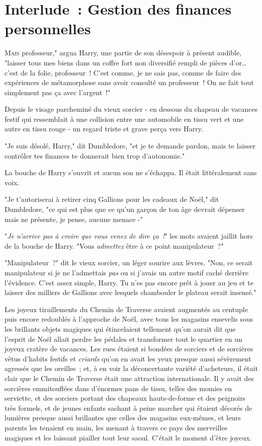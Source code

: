 \chapter{Interlude~: Gestion des finances personnelles}

\lettrine[ante=<<~]{M}{ais} professeur," argua Harry, une partie de son désespoir à présent audible, "laisser tous mes biens dans un coffre fort non diversifié rempli de pièces d'or… c'est de la folie, professeur~! C'est comme, je ne sais pas, comme de faire des expériences de métamorphose sans avoir consulté un professeur~! On ne fait tout simplement pas ça avec l'argent~!"

Depuis le visage parcheminé du vieux sorcier - en dessous du chapeau de vacances festif qui ressemblait à une collision entre une automobile en tissu vert et une autre en tissu rouge - un regard triste et grave perça vers Harry.

"Je suis désolé, Harry," dit Dumbledore, "et je te demande pardon, mais te laisser contrôler tes finances te donnerait bien trop d'autonomie."

La bouche de Harry s'ouvrit et aucun son ne s'échappa. Il était littéralement sans voix.

"Je t'autoriserai à retirer cinq Gallions pour les cadeaux de Noël," dit Dumbledore, "ce qui est plus que ce qu'un garçon de ton âge devrait dépenser mais ne présente, je pense, aucune menace -"

"\emph{Je n'arrive pas à croire que vous venez de dire ça~!}" les mots avaient jaillit hors de la bouche de Harry. "Vous \emph{admettez} être à ce point manipulateur~?"

"Manipulateur~?" dit le vieux sorcier, un léger sourire aux lèvres. "Non, ce serait manipulateur si je ne l'admettais \emph{pas} ou si j'avais un autre motif caché derrière l'évidence. C'est assez simple, Harry. Tu n'es pas encore prêt à jouer au jeu et te laisser des milliers de Gallions avec lesquels chambouler le plateau serait insensé."

\later

Les joyeux tiraillements du Chemin de Traverse avaient augmentés au centuple puis encore redoublés à l'approche de Noël, avec tous les magasins ensevelis sous les brillants objets magiques qui étincelaient tellement qu'on aurait dit que l'esprit de Noël allait perdre les pédales et transformer tout le quartier en un joyeux cratère de vacances. Les rues étaient si bondées de sorciers et de sorcières vêtus d'habits festifs et \emph{criards} qu'on en avait les yeux presque aussi sévèrement agressés que les oreilles~; et, à en voir la déconcertante variété d'acheteurs, il était clair que le Chemin de Traverse était une attraction internationale. Il y avait des sorcières emmitouflées dans d'énormes pans de tissu, telles des momies en serviette, et des sorciers portant des chapeaux hauts-de-forme et des peignoirs très formels, et de jeunes enfants sachant à peine marcher qui étaient décorés de lumières presque aussi brillantes que celles des magasins eux-mêmes, et leurs parents les tenaient en main, les menant à travers ce pays des merveilles magiques et les laissant piailler tout leur saoul. C'était le moment d'être joyeux.

